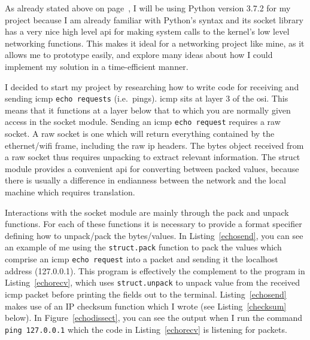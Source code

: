 \documentclass[titlepage]{article}
\begin{document}
As already stated above on page~\pageref{pythonreason},
I will be using Python version 3.7.2 for my project because I am already familiar with Python's
syntax and its socket library has a very nice high level \gls{api} for making system calls to
the kernel's low level networking functions. This makes it ideal for a networking project
like mine, as it allows me to prototype easily, and explore many ideas about how I could implement
my solution in a time-efficient manner.

I decided to start my project by researching how to write code for receiving and sending
\gls{icmp} \verb|echo requests| (i.e.\ pings).
\gls{icmp} sits at layer 3 of the \gls{osi}.
This means that it functions at a layer below that to which you are normally given access in the socket module.
Sending an \gls{icmp} \verb|echo request| requires a raw socket.
A raw socket is one which will return everything contained by the ethernet/wifi frame, including
the raw \gls{ip} headers.
The bytes object received from a raw socket thus requires unpacking to extract relevant information.
The struct module provides a convenient \gls{api} for converting between packed values,
because there is usually a difference in endianness between the network and the local machine
which requires translation.

Interactions with the socket module are mainly through the pack and unpack functions.
For each of these functions it is necessary to provide a format specifier defining how
to unpack/pack the bytes/values. 
In Listing~\ref{echosend}, you can see an example of me using the \verb|struct.pack| function to pack
the values which comprise an \gls{icmp} \verb|echo request| into a packet and sending it the localhost
address (127.0.0.1). This program is effectively the complement to the program in
Listing~\ref{echorecv}, which uses \verb|struct.unpack| to unpack value from the received \gls{icmp}
packet before printing the fields out to the terminal. Listing~\ref{echosend} makes use of an
IP checksum function which I wrote (see Listing~\ref{checksum} below).
In Figure~\ref{echodissect}, you can see the output when I run the command
\verb|ping 127.0.0.1| which the code in Listing~\ref{echorecv} is listening for packets.

\begin{algorithm}
\begin{algorithmic}[1]
\MakeRobust{\Call}
\end{algorithmic}
\caption{\textit{%
  The psuedocode representation of Listing~\ref{echosend}.
}}
\end{algorithm}
\end{document}
